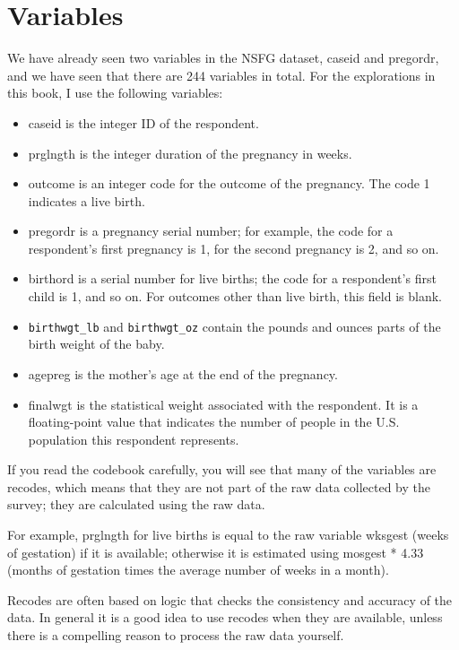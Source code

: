 \documentclass[]{book}
\begin{document}
\hypertarget{variables}{%
\section{Variables}\label{variables}}

We have already seen two variables in the
NSFG dataset, caseid and
pregordr, and we have seen
that there are 244 variables in total. For the explorations in this
book, I use the following variables:

\begin{itemize}
\item
  caseid is the integer ID of the
  respondent.
\item
  prglngth is the integer
  duration of the pregnancy in weeks.
\item
  outcome is an integer code for
  the outcome of the pregnancy. The code 1 indicates a live
  birth.
\item
  pregordr is a pregnancy serial
  number; for example, the code for a respondent's first pregnancy is
  1, for the second pregnancy is 2, and so on.
\item
  birthord is a serial number for
  live births; the code for a respondent's first child is 1, and so
  on. For outcomes other than live birth, this field is blank.
\item
  \texttt{birthwgt\_lb} and \texttt{birthwgt\_oz}
  contain the pounds and ounces parts of the birth weight of the baby.
\item
  agepreg is the mother's age at
  the end of the pregnancy.
\item
  finalwgt is the statistical
  weight associated with the respondent. It is a floating-point value
  that indicates the number of people in the U.S. population this
  respondent represents.
\end{itemize}

If you read the codebook carefully, you
will see that many of the variables are recodes, which means that they are not
part of the raw data collected by
the survey; they are calculated using the raw data.

For example, prglngth for live births is equal
to the raw variable wksgest
(weeks of gestation) if it is available; otherwise it is estimated using
mosgest * 4.33 (months of
gestation times the average number of weeks in a month).

Recodes are often based on logic that
checks the consistency and accuracy of the data. In general it is a good
idea to use recodes when they are available, unless there is a
compelling reason to process the raw data yourself.
\end{document}
